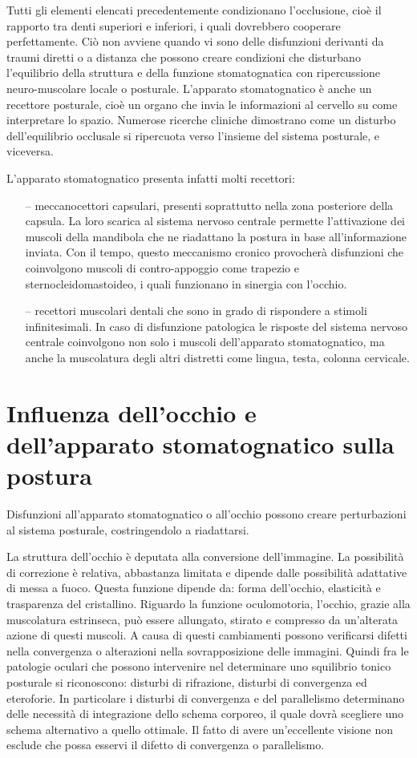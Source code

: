 Tutti gli elementi elencati precedentemente condizionano l’occlusione, cioè il rapporto tra denti superiori e inferiori, i quali dovrebbero cooperare perfettamente. Ciò non avviene quando vi sono delle disfunzioni derivanti da traumi diretti o a distanza che possono creare condizioni che disturbano l’equilibrio della struttura e della funzione stomatognatica con ripercussione neuro-muscolare locale o posturale. L’apparato stomatognatico è anche un recettore posturale, cioè un organo che invia le informazioni al cervello su come interpretare lo spazio. Numerose ricerche cliniche dimostrano come un disturbo dell’equilibrio occlusale si ripercuota verso l’insieme del sistema posturale, e viceversa. 

L’apparato stomatognatico presenta infatti molti recettori:
\begin{itemize}
 \itemsep-0.5em 
 \item[--]meccanocettori capsulari, presenti soprattutto nella zona posteriore della capsula. La loro scarica al sistema nervoso centrale permette l’attivazione dei muscoli della mandibola che ne riadattano la postura in base all’informazione inviata. Con il tempo, questo meccanismo cronico provocherà disfunzioni che coinvolgono muscoli di contro-appoggio come trapezio e sternocleidomastoideo, i quali funzionano in sinergia con l’occhio.
 \item[--]recettori muscolari
 \precettori dentali che sono in grado di rispondere a stimoli infinitesimali. In caso di disfunzione patologica le risposte del sistema nervoso centrale coinvolgono non solo i muscoli dell’apparato stomatognatico, ma anche la muscolatura degli altri distretti come lingua, testa, colonna cervicale.
\end{itemize}
 
 
\section{Influenza dell’occhio e dell’apparato stomatognatico sulla postura}
 
Disfunzioni all’apparato stomatognatico o all’occhio possono creare perturbazioni al sistema posturale, costringendolo a riadattarsi. 
 
La struttura dell’occhio è deputata alla conversione dell’immagine. La possibilità di correzione è relativa, abbastanza limitata e dipende dalle possibilità adattative di messa a fuoco. Questa funzione dipende da: forma dell’occhio, elasticità e trasparenza del cristallino. Riguardo la funzione oculomotoria, l’occhio, grazie alla muscolatura estrinseca, può essere allungato, stirato e compresso da un’alterata azione di questi muscoli. A causa di questi cambiamenti possono verificarsi difetti nella convergenza o alterazioni nella sovrapposizione delle immagini. Quindi fra le patologie oculari che possono intervenire nel determinare uno squilibrio tonico posturale si riconoscono: disturbi di rifrazione, disturbi di convergenza  ed eteroforie. In particolare i disturbi di convergenza e del parallelismo determinano delle necessità di integrazione dello schema corporeo, il quale dovrà scegliere uno schema alternativo a quello ottimale. Il fatto di avere un’eccellente visione non esclude che possa esservi il difetto di convergenza o parallelismo.

